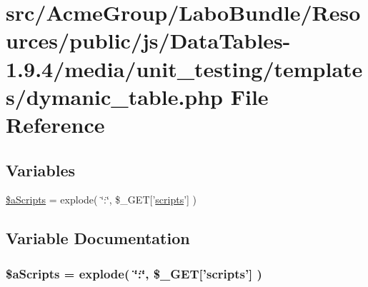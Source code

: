 \hypertarget{dymanic__table_8php}{\section{src/\+Acme\+Group/\+Labo\+Bundle/\+Resources/public/js/\+Data\+Tables-\/1.9.4/media/unit\+\_\+testing/templates/dymanic\+\_\+table.php File Reference}
\label{dymanic__table_8php}
}
\subsection*{Variables}
\begin{DoxyCompactItemize}
\item 
\hyperlink{dymanic__table_8php_a3e8e1608000c9afdd05327fc2b06b056}{\$a\+Scripts} = explode( \char`\"{}\+:\char`\"{}, \$\+\_\+\+G\+E\+T\mbox{[}'\hyperlink{tinymce_8jquery_8dev_8js_a09066d4d580eeec222f858d588b4cdef}{scripts}'\mbox{]} )
\end{DoxyCompactItemize}


\subsection{Variable Documentation}
\hypertarget{dymanic__table_8php_a3e8e1608000c9afdd05327fc2b06b056}{
\subsubsection[{\$a\+Scripts}]{\setlength{\rightskip}{0pt plus 5cm}\$a\+Scripts = explode( \char`\"{}\+:\char`\"{}, \$\+\_\+\+G\+E\+T\mbox{[}'{\bf scripts}'\mbox{]} )}}\label{dymanic__table_8php_a3e8e1608000c9afdd05327fc2b06b056}
